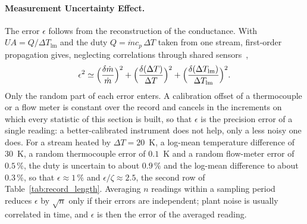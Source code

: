 \documentclass[preprint,12pt]{elsarticle}
\begin{document}
\paragraph*{Measurement Uncertainty Effect.}
The error $\epsilon$ follows from the reconstruction of the conductance. With
$UA=Q/\Delta T_{\mathrm{lm}}$ and the duty $Q=\dot m c_p\,\Delta T$ taken from
one stream, first-order propagation gives, neglecting correlations through
shared sensors~\cite{Tatara2011,Shen2015},
\begin{equation}
  \epsilon^{2}\simeq\Bigl(\frac{\delta\dot m}{\dot m}\Bigr)^{2}
  +\Bigl(\frac{\delta(\Delta T)}{\Delta T}\Bigr)^{2}
  +\Bigl(\frac{\delta(\Delta T_{\mathrm{lm}})}{\Delta T_{\mathrm{lm}}}\Bigr)^{2}.
  \label{eq:epsilon_propagation}
\end{equation}
Only the random part of each error enters. A calibration offset of a
thermocouple or a flow meter is constant over the record and cancels in the
increments on which every statistic of this section is built, so that
$\epsilon$ is the precision error of a single reading: a better-calibrated
instrument does not help, only a less noisy one does. For a stream heated by
$\Delta T=20$~K, a log-mean temperature difference of $30$~K, a random
thermocouple error of $0.1$~K and a random flow-meter error of $0.5\,\%$, the
duty is uncertain to about $0.9\,\%$ and the log-mean difference to about
$0.3\,\%$, so that $\epsilon\approx1\,\%$ and $\epsilon/\zeta\approx2.5$, the
second row of Table~\ref{tab:record_length}. Averaging $n$ readings within a
sampling period reduces $\epsilon$ by $\sqrt n$ only if their errors are
independent; plant noise is usually correlated in time, and $\epsilon$ is
then the error of the averaged reading.
\end{document}
